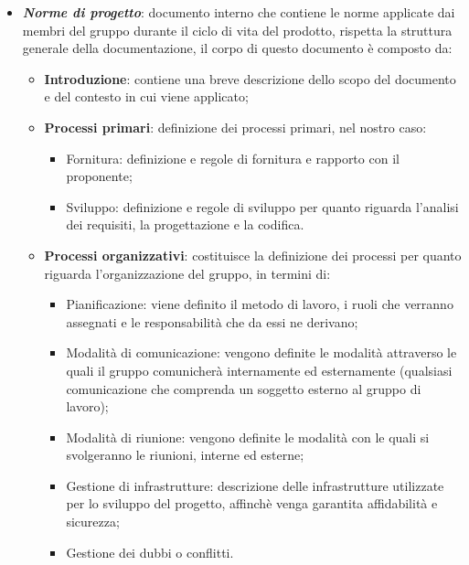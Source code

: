 \begin{itemize}
        \item \textit{\textbf{Norme di progetto}}: documento interno che contiene le norme applicate dai membri del gruppo durante il ciclo di vita del prodotto, rispetta la struttura generale della documentazione, il corpo di questo documento è composto da:
        \begin{itemize}
            \item \textbf{Introduzione}: contiene una breve descrizione dello scopo del documento e del contesto in cui viene applicato;    
            \item \textbf{Processi primari}: definizione dei processi primari, nel nostro caso:
            \begin{itemize}
                \item Fornitura: definizione e regole di fornitura e rapporto con il proponente;
                \item Sviluppo: definizione e regole di sviluppo per quanto riguarda l'analisi dei requisiti, la progettazione e la codifica.
            \end{itemize}
            \item \textbf{Processi organizzativi}: costituisce la definizione dei processi per quanto riguarda l'organizzazione del gruppo, in termini di:
            \begin{itemize}
                \item Pianificazione: viene definito il metodo di lavoro, i ruoli che verranno assegnati e le responsabilità che da essi ne derivano;
                \item Modalità di comunicazione: vengono definite le modalità attraverso le quali il gruppo comunicherà internamente ed esternamente (qualsiasi comunicazione che comprenda un soggetto esterno al gruppo di lavoro);
                \item Modalità di riunione: vengono definite le modalità con le quali si svolgeranno le riunioni, interne ed esterne;
                \item Gestione di infrastrutture: descrizione delle infrastrutture utilizzate per lo sviluppo del progetto, affinchè venga garantita affidabilità e sicurezza;
                \item Gestione dei dubbi o conflitti.
            \end{itemize}


\end{itemize}
\end{itemize}
